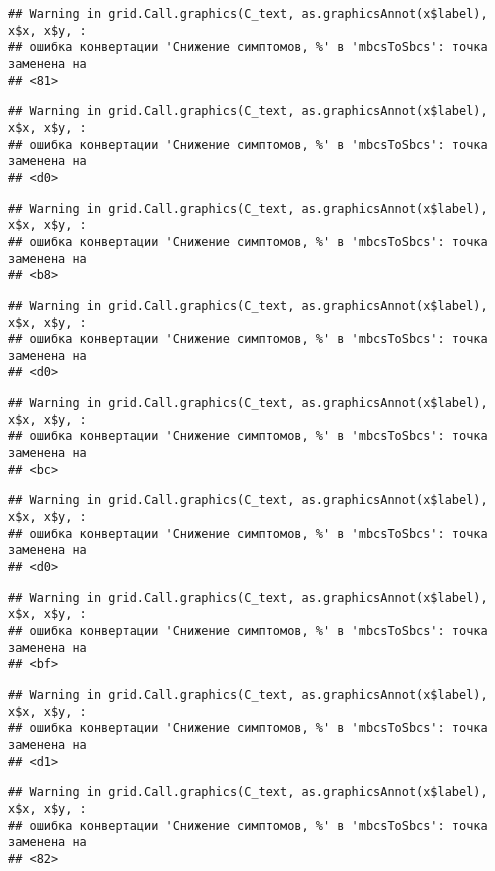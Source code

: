 \documentclass[
]{article}
\begin{document}
\begin{verbatim}
## Warning in grid.Call.graphics(C_text, as.graphicsAnnot(x$label), x$x, x$y, :
## ошибка конвертации 'Снижение симптомов, %' в 'mbcsToSbcs': точка заменена на
## <81>
\end{verbatim}

\begin{verbatim}
## Warning in grid.Call.graphics(C_text, as.graphicsAnnot(x$label), x$x, x$y, :
## ошибка конвертации 'Снижение симптомов, %' в 'mbcsToSbcs': точка заменена на
## <d0>
\end{verbatim}

\begin{verbatim}
## Warning in grid.Call.graphics(C_text, as.graphicsAnnot(x$label), x$x, x$y, :
## ошибка конвертации 'Снижение симптомов, %' в 'mbcsToSbcs': точка заменена на
## <b8>
\end{verbatim}

\begin{verbatim}
## Warning in grid.Call.graphics(C_text, as.graphicsAnnot(x$label), x$x, x$y, :
## ошибка конвертации 'Снижение симптомов, %' в 'mbcsToSbcs': точка заменена на
## <d0>
\end{verbatim}

\begin{verbatim}
## Warning in grid.Call.graphics(C_text, as.graphicsAnnot(x$label), x$x, x$y, :
## ошибка конвертации 'Снижение симптомов, %' в 'mbcsToSbcs': точка заменена на
## <bc>
\end{verbatim}

\begin{verbatim}
## Warning in grid.Call.graphics(C_text, as.graphicsAnnot(x$label), x$x, x$y, :
## ошибка конвертации 'Снижение симптомов, %' в 'mbcsToSbcs': точка заменена на
## <d0>
\end{verbatim}

\begin{verbatim}
## Warning in grid.Call.graphics(C_text, as.graphicsAnnot(x$label), x$x, x$y, :
## ошибка конвертации 'Снижение симптомов, %' в 'mbcsToSbcs': точка заменена на
## <bf>
\end{verbatim}

\begin{verbatim}
## Warning in grid.Call.graphics(C_text, as.graphicsAnnot(x$label), x$x, x$y, :
## ошибка конвертации 'Снижение симптомов, %' в 'mbcsToSbcs': точка заменена на
## <d1>
\end{verbatim}

\begin{verbatim}
## Warning in grid.Call.graphics(C_text, as.graphicsAnnot(x$label), x$x, x$y, :
## ошибка конвертации 'Снижение симптомов, %' в 'mbcsToSbcs': точка заменена на
## <82>
\end{verbatim}
\end{document}
